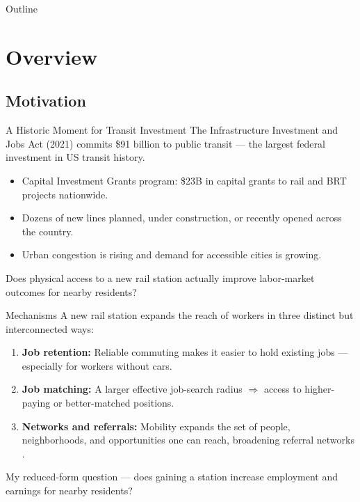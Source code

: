 \begin{frame}[plain,label=title]
  \titlepage
\end{frame}
\begin{frame}[label=outline]{Outline}
  \tableofcontents
\end{frame}
\section{Overview}
\subsection{Motivation}
\begin{frame}[label=motivation1]{A Historic Moment for Transit Investment}
\small
The Infrastructure Investment and Jobs Act (2021) commits \$91 billion to public
transit --- the largest federal investment in US transit history.
\bigskip
\begin{itemize}
  \item Capital Investment Grants program: \$23B in capital grants to rail and BRT projects nationwide.
  \item Dozens of new lines planned, under construction, or recently opened across the country.
  \item Urban congestion is rising and demand for accessible cities is growing.
\end{itemize}
\bigskip
Does physical access to a new rail station
actually improve labor-market outcomes for nearby residents?
\end{frame}
\begin{frame}[label=mechanisms]{Mechanisms}
\small
A new rail station expands the reach of workers in three distinct but interconnected ways:
\bigskip
\begin{enumerate}
  \item \textbf{Job retention:} Reliable commuting makes it easier to hold existing jobs ---
        especially for workers without cars.
  \item \textbf{Job matching:} A larger effective job-search radius
        $\Rightarrow$ access to higher-paying or better-matched positions.
  \item \textbf{Networks and referrals:} Mobility expands the set of people, neighborhoods,
        and opportunities one can reach, broadening referral networks
        \parencite{patacchini_referral_fx}.
\end{enumerate}
\bigskip
My reduced-form question --- does gaining a station increase
employment and earnings for nearby residents?
\end{frame}
